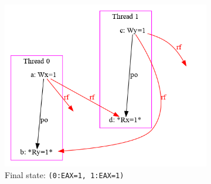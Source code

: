 \begin{figure}[!htb]
\centering
\begin{subfigure}[t]{.28\textwidth}
  \centering
  \includegraphics[width=1.2\linewidth]{img/my/sb-example/SB-dot.png}
  \caption{Final state: \texttt{(0:EAX=1,~1:EAX=1)}}
  \label{simple_wmm_x86_pic:sub1}
\end{subfigure}
\hfill
\begin{subfigure}[t]{.23\textwidth}
  \centering

\end{subfigure}
\end{figure}
